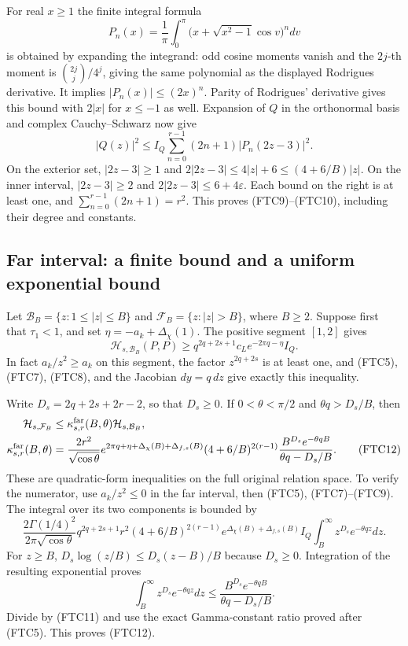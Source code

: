 For real $x\ge1$ the finite integral formula
\[
 P_n(x)=\frac1\pi\int_0^\pi
 \bigl(x+\sqrt{x^2-1}\cos v\bigr)^n dv
\]
is obtained by expanding the integrand: odd cosine moments vanish and
the $2j$-th moment is $\binom{2j}{j}/4^j$, giving the same polynomial as
the displayed Rodrigues derivative.  It implies $|P_n(x)|\le(2x)^n$.
Parity of Rodrigues' derivative gives this bound with $2|x|$ for
$x\le-1$ as well.  Expansion of $Q$ in the orthonormal basis and complex
Cauchy--Schwarz now give
\[
 |Q(z)|^2\le I_Q\sum_{n=0}^{r-1}(2n+1)|P_n(2z-3)|^2.
\]
On the exterior set, $|2z-3|\ge1$ and
$2|2z-3|\le4|z|+6\le(4+6/B)|z|$.  On the inner interval,
$|2z-3|\ge2$ and $2|2z-3|\le6+4\varepsilon$.
Each bound on the right is at least one, and
$\sum_{n=0}^{r-1}(2n+1)=r^2$.  This proves (FTC9)--(FTC10), including
their degree and constants.

\subsection{Far interval: a finite bound and a uniform exponential bound}

Let $\mathcal B_B=\{z:1\le|z|\le B\}$ and
$\mathcal F_B=\{z:|z|>B\}$, where $B\ge2$.
Suppose first that $\tau_1<1$, and set
$\eta=-a_k+\Delta_\chi(1)$.  The positive segment $[1,2]$ gives
\begin{equation}
 \mathcal H_{s,\mathcal B_B}(P,P)
 \ge q^{2q+2s+1}c_L e^{-2\pi q-\eta} I_Q.
 \tag{FTC11}
\end{equation}
In fact $a_k/z^2\ge a_k$ on this segment, the factor $z^{2q+2s}$ is at
least one, and (FTC5), (FTC7), (FTC8), and the Jacobian $dy=q\,dz$ give
exactly this inequality.

Write $D_s=2q+2s+2r-2$, so that $D_s\ge0$.  If
$0<\theta<\pi/2$ and $\theta q>D_s/B$, then
\begin{align}
 \mathcal H_{s,\mathcal F_B}&\le\kappa_{s,r}^{\mathrm{far}}(B,\theta)
 \mathcal H_{s,\mathcal B_B},\notag\\
 \kappa_{s,r}^{\mathrm{far}}(B,\theta)
 &=\frac{2r^2}{\sqrt{\cos\theta}}
 e^{2\pi q+\eta+\Delta_\chi(B)+\Delta_{f,s}(B)}
 (4+6/B)^{2(r-1)}
 \frac{B^{D_s}e^{-\theta qB}}{\theta q-D_s/B}.
 \tag{FTC12}
\end{align}
These are quadratic-form inequalities on the full original relation space.
To verify the numerator, use $a_k/z^2\le0$ in the far interval, then
(FTC5), (FTC7)--(FTC9).  The integral over its two components is bounded
by
\[
 \frac{2\Gamma(1/4)^2}{2\pi\sqrt{\cos\theta}}
 q^{2q+2s+1}r^2(4+6/B)^{2(r-1)}
 e^{\Delta_\chi(B)+\Delta_{f,s}(B)}I_Q
 \int_B^\infty z^{D_s}e^{-\theta qz}dz.
\]
For $z\ge B$, $D_s\log(z/B)\le D_s(z-B)/B$ because $D_s\ge0$.
Integration of the resulting exponential proves
\[
 \int_B^\infty z^{D_s}e^{-\theta qz}dz
 \le\frac{B^{D_s}e^{-\theta qB}}{\theta q-D_s/B}.
\]
Divide by (FTC11) and use the exact Gamma-constant ratio proved after
(FTC5).  This proves (FTC12).

